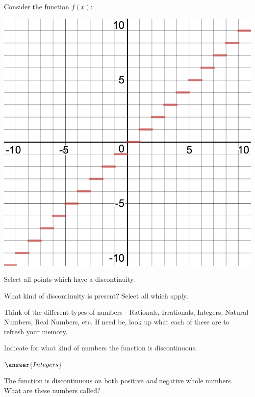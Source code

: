 \documentclass{ximera}
\begin{document}
\begin{question}
Consider the function $f(x)$:
\begin{image}
\includegraphics{continuity6}
\end{image}
Select all points which have a discontinuity.

\begin{selectAll}
\end{selectAll}

What kind of discontinuity is present? Select all which apply.

\begin{selectAll}
\end{selectAll}

\begin{hint}
Think of the different types of numbers - Rationals, Irrationals, Integers, Natural Numbers, Real Numbers, etc. If need be, look up what each of these are to refresh your memory.
\end{hint}
Indicate for what kind of numbers the function is discontinuous.

$\answer{Integers}$
\begin{feedback}
The function is discontinuous on both positive \textit{and} negative whole numbers. What are these numbers called?
\end{feedback}
\end{question}
\end{document}
